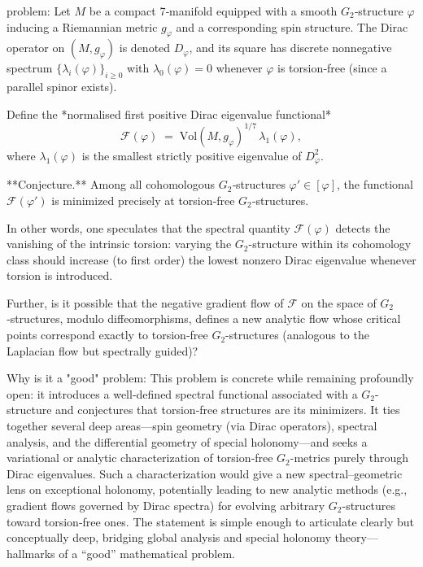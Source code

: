 problem:  
Let \(M\) be a compact 7‑manifold equipped with a smooth \(G_2\)‑structure \(\varphi\) inducing a Riemannian metric \(g_\varphi\) and a corresponding spin structure. The Dirac operator on \((M,g_\varphi)\) is denoted \(D_\varphi\), and its square has discrete nonnegative spectrum \(\{ \lambda_i(\varphi) \}_{i \ge 0}\) with \(\lambda_0(\varphi)=0\) whenever \(\varphi\) is torsion‑free (since a parallel spinor exists).  

Define the *normalised first positive Dirac eigenvalue functional*  
\[
\mathcal{F}(\varphi) \;=\; \mathrm{Vol}(M,g_\varphi)^{1/7}\,\lambda_1(\varphi),
\]
where \(\lambda_1(\varphi)\) is the smallest strictly positive eigenvalue of \(D_\varphi^2\).  

**Conjecture.** Among all cohomologous \(G_2\)‑structures \(\varphi' \in [\varphi]\), the functional \(\mathcal{F}(\varphi')\) is minimized precisely at torsion‑free \(G_2\)‑structures.  

In other words, one speculates that the spectral quantity \(\mathcal{F}(\varphi)\) detects the vanishing of the intrinsic torsion: varying the \(G_2\)-structure within its cohomology class should increase (to first order) the lowest nonzero Dirac eigenvalue whenever torsion is introduced.  

Further, is it possible that the negative gradient flow of \(\mathcal{F}\) on the space of \(G_2\)‑structures, modulo diffeomorphisms, defines a new analytic flow whose critical points correspond exactly to torsion‑free \(G_2\)-structures (analogous to the Laplacian flow but spectrally guided)?  

Why is it a "good" problem:  
This problem is concrete while remaining profoundly open: it introduces a well-defined spectral functional associated with a \(G_2\)-structure and conjectures that torsion‑free structures are its minimizers. It ties together several deep areas—spin geometry (via Dirac operators), spectral analysis, and the differential geometry of special holonomy—and seeks a variational or analytic characterization of torsion‑free \(G_2\)-metrics purely through Dirac eigenvalues. Such a characterization would give a new spectral–geometric lens on exceptional holonomy, potentially leading to new analytic methods (e.g., gradient flows governed by Dirac spectra) for evolving arbitrary \(G_2\)-structures toward torsion‑free ones. The statement is simple enough to articulate clearly but conceptually deep, bridging global analysis and special holonomy theory—hallmarks of a “good” mathematical problem.